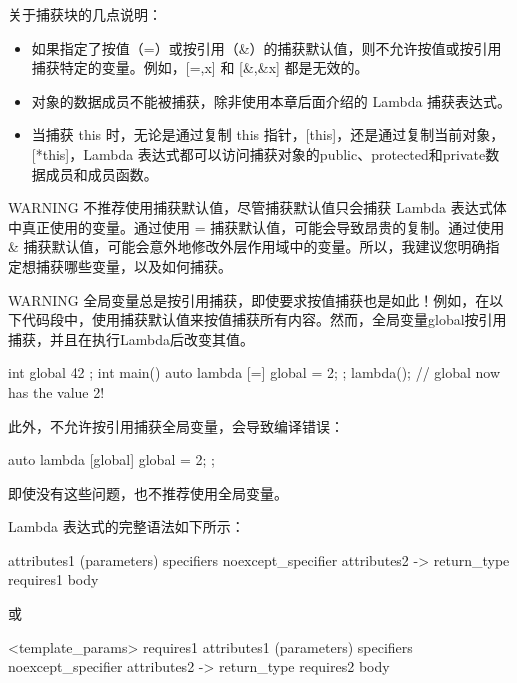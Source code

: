 关于捕获块的几点说明：

\begin{itemize}
\item
如果指定了按值（=）或按引用（\&）的捕获默认值，则不允许按值或按引用捕获特定的变量。例如，[=,x] 和 [\&,\&x] 都是无效的。

\item
对象的数据成员不能被捕获，除非使用本章后面介绍的 Lambda 捕获表达式。

\item
当捕获 this 时，无论是通过复制 this 指针，[this]，还是通过复制当前对象，[*this]，Lambda 表达式都可以访问捕获对象的public、protected和private数据成员和成员函数。
\end{itemize}

\begin{myWarning}{WARNING}
不推荐使用捕获默认值，尽管捕获默认值只会捕获 Lambda 表达式体中真正使用的变量。通过使用 = 捕获默认值，可能会导致昂贵的复制。通过使用 \& 捕获默认值，可能会意外地修改外层作用域中的变量。所以，我建议您明确指定想捕获哪些变量，以及如何捕获。
\end{myWarning}

\begin{myWarning}{WARNING}
全局变量总是按引用捕获，即使要求按值捕获也是如此！例如，在以下代码段中，使用捕获默认值来按值捕获所有内容。然而，全局变量global按引用捕获，并且在执行Lambda后改变其值。

\begin{cpp}
int global { 42 };
int main()
{
    auto lambda { [=] { global = 2; } };
    lambda();
    // global now has the value 2!
}
\end{cpp}

此外，不允许按引用捕获全局变量，会导致编译错误：

\begin{cpp}
auto lambda { [global] { global = 2; } };
\end{cpp}

即使没有这些问题，也不推荐使用全局变量。
\end{myWarning}

Lambda 表达式的完整语法如下所示：

\begin{cpp}
 attributes1 (parameters) specifiers noexcept_specifier attributes2
    -> return_type requires1 {body}
\end{cpp}

或

\begin{cpp}
 <template_params> requires1 attributes1 (parameters) specifiers
    noexcept_specifier attributes2 -> return_type requires2 {body}
\end{cpp}

